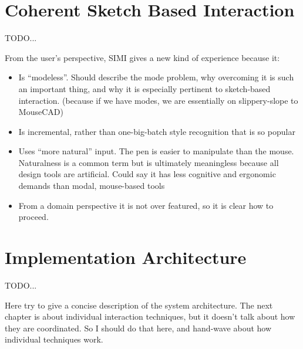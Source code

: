 \section{Coherent Sketch Based Interaction}

TODO...

From the user's perspective, SIMI gives a new kind of experience
because it:

\begin{itemize}
\item Is ``modeless''. Should describe the mode problem, why
  overcoming it is such an important thing, and why it is especially
  pertinent to sketch-based interaction. (because if we have modes, we
  are essentially on slippery-slope to MouseCAD)
\item Is incremental, rather than one-big-batch style recognition that
  is so popular
\item Uses ``more natural'' input. The pen is easier to manipulate
  than the mouse. Naturalness is a common term but is ultimately
  meaningless because all design tools are artificial. Could say it
  has less cognitive and ergonomic demands than modal, mouse-based
  tools
\item From a domain perspective it is not over featured, so it is
  clear how to proceed.
\end{itemize}

\section{Implementation Architecture}

TODO...

Here try to give a concise description of the system architecture. The
next chapter is about individual interaction techniques, but it
doesn't talk about how they are coordinated. So I should do that here,
and hand-wave about how individual techniques work.
